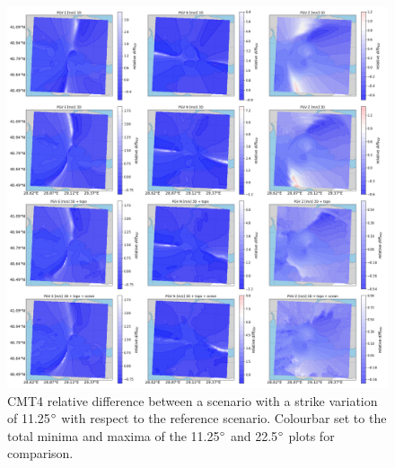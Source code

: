 \documentclass[../Text/00main.tex]{subfiles}
\begin{document}
\begin{figure}[!h]
    \centering
    \includegraphics[width=1\linewidth]{images_results/strike_variation_epsilon12_sc4.png}
    \caption{CMT4 relative difference between a scenario with a strike variation of 11.25$\degree$ with respect to the reference scenario. Colourbar set to the total minima and maxima of the 11.25$\degree$ and 22.5$\degree$ plots for comparison.}
    \label{fig:ref_eps12-2}
\end{figure}

\FloatBarrier
\end{document}
